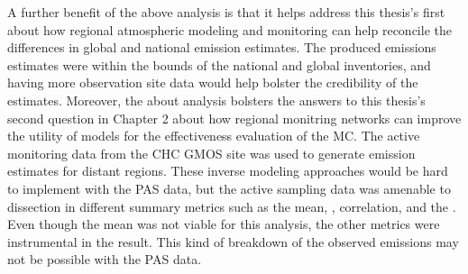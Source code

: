   \begin{flushleft}
  A further benefit of the above analysis is that it helps address this thesis's first about how regional atmospheric modeling and monitoring can help reconcile the differences in global and national emission estimates. The produced emissions estimates were within the bounds of the national and global inventories, and having more observation site data would help bolster the credibility of the estimates. Moreover, the about analysis bolsters the answers to this thesis's second question in Chapter 2 about how regional monitring networks can improve the utility of models for the effectiveness evaluation of the MC. The active monitoring data from the CHC GMOS site was used to generate emission estimates for distant regions. These inverse modeling approaches would be hard to implement with the PAS data, but the active sampling data was amenable to dissection in different summary metrics such as the mean, \iq, correlation, and the \nft. Even though the mean was not viable for this analysis, the other metrics were instrumental in the result. This kind of breakdown of the observed emissions may not be possible with the PAS data.
\end{flushleft}

\newpage
